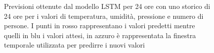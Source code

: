 \documentclass{article}
\begin{document}
\begin{figure}
    \centering
    \qquad
    \qquad
    \qquad
    \caption{Previsioni ottenute dal modello LSTM per 24 ore con uno storico di 24 ore per i valori di temperatura, umidità, pressione e numero di persone. I punti in rosso rappresentano i valori predetti mentre quelli in blu i valori attesi, in azzuro è rappresentata la finestra temporale utilizzata per predirre i nuovi valori}
    \label{fig:lstm}
\end{figure}
\end{document}

